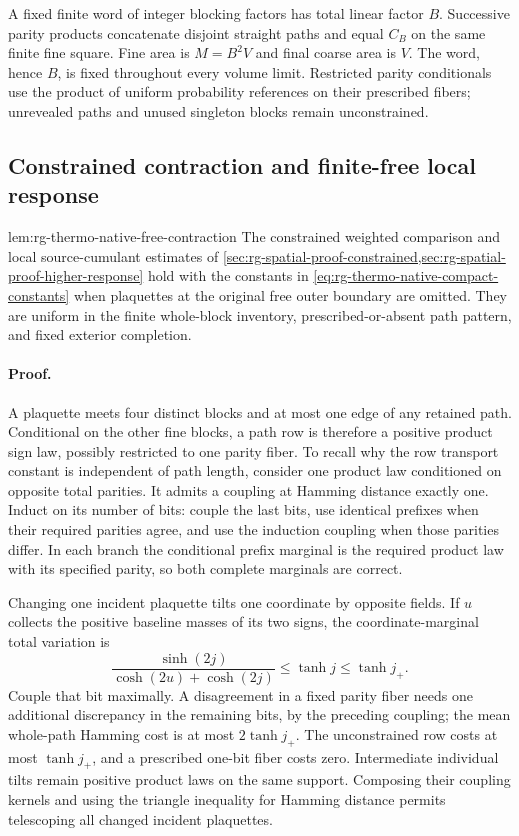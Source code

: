 A fixed finite word of integer blocking factors has total linear factor
\(B\). Successive parity products concatenate disjoint straight paths
and equal \(C_B\) on the same finite fine square. Fine area is
\(M=B^2V\) and final coarse area is \(V\). The word, hence \(B\), is
fixed throughout every volume limit. Restricted parity conditionals use
the product of uniform probability references on their prescribed fibers;
unrevealed paths and unused singleton blocks remain unconstrained.\thermodeclareddefinition


\subsection{Constrained contraction and finite-free local response}
\label{sec:rg-thermo-native-free-response}

{lem:rg-thermo-native-free-contraction}
The constrained weighted comparison and local source-cumulant estimates
of \cref{sec:rg-spatial-proof-constrained,sec:rg-spatial-proof-higher-response}
hold with the constants in \cref{eq:rg-thermo-native-compact-constants}
when plaquettes at the original free outer boundary are omitted. They are
uniform in the finite whole-block inventory, prescribed-or-absent path
pattern, and fixed exterior completion.\thermoestablishedstatus


\paragraph{Proof.}
A plaquette meets four distinct blocks and at most one edge of any retained
path. Conditional on the other fine blocks, a path row is therefore a
positive product sign law, possibly restricted to one parity fiber. To
recall why the row transport constant is independent of path length,
consider one product law conditioned on opposite total parities. It admits
a coupling at Hamming distance exactly one. Induct on its number of bits:
couple the last bits, use identical prefixes when their required parities
agree, and use the induction coupling when those parities differ. In each
branch the conditional prefix marginal is the required product law with
its specified parity, so both complete marginals are correct.

Changing one incident plaquette tilts one coordinate by opposite fields.
If \(u\) collects the positive baseline masses of its two signs, the
coordinate-marginal total variation is
\begin{equation}
 \frac{\sinh(2j)}{\cosh(2u)+\cosh(2j)}\le\tanh j\le\tanh j_+.
 \label{eq:rg-thermo-native-fiber-tilt}
\end{equation}
Couple that bit maximally. A disagreement in a fixed parity fiber needs
one additional discrepancy in the remaining bits, by the preceding
coupling; the mean whole-path Hamming cost is at most \(2\tanh j_+\).
The unconstrained row costs at most \(\tanh j_+\), and a prescribed
one-bit fiber costs zero. Intermediate individual tilts remain positive
product laws on the same support. Composing their coupling kernels and
using the triangle inequality for Hamming distance permits telescoping
all changed incident plaquettes.

